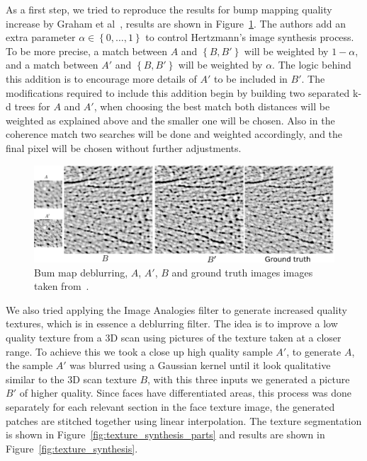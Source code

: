 \documentclass[11pt]{report}
\begin{document}
As a first step, we tried to reproduce the results for bump mapping quality increase by Graham et al~\cite{Graham2013}, results are shown in Figure~\ref{fig:bump_maps}.
The authors add an extra parameter $\alpha \in \left\lbrace 0, \ldots, 1 \right\rbrace$ to control Hertzmann's image synthesis process.
To be more precise, a match between $A$ and $\left\lbrace B,B' \right\rbrace$ will be weighted by $1 - \alpha$, and a match between $A'$ and $\left\lbrace B,B' \right\rbrace$ will be weighted by $\alpha$.
The logic behind this addition is to encourage more details of $A'$ to be included in $B'$.
The modifications required to include this addition begin by building two separated k-d trees for $A$ and $A'$, when choosing the best match both distances will be weighted as explained above and the smaller one will be chosen.
Also in the coherence match two searches will be done and weighted accordingly, and the final pixel will be chosen without further adjustments.

\begin{figure}[htbp!]
\centering
\includegraphics[width=\textwidth]{img/bump_maps}
	\caption{ Bum map deblurring, $A$, $A'$, $B$ and ground truth images images taken from~\cite{Graham2013}.}
	\label{fig:bump_maps}
\end{figure}

We also tried applying the Image Analogies filter to generate increased quality textures, which is in essence a deblurring filter.
The idea is to improve a low quality texture from a 3D scan using pictures of the texture taken at a closer range.
To achieve this we took a close up high quality sample $A'$, to generate $A$, the sample $A'$ was blurred using a Gaussian kernel until it look qualitative similar to the 3D scan texture $B$, with this three inputs we generated a picture $B'$ of higher quality.
Since faces have differentiated areas, this process was done separately for each relevant section in the face texture image, the generated patches are stitched together using linear interpolation.
The texture segmentation is shown in Figure~\ref{fig:texture_synthesis_parts} and results are shown in Figure~\ref{fig:texture_synthesis}.
\end{document}
